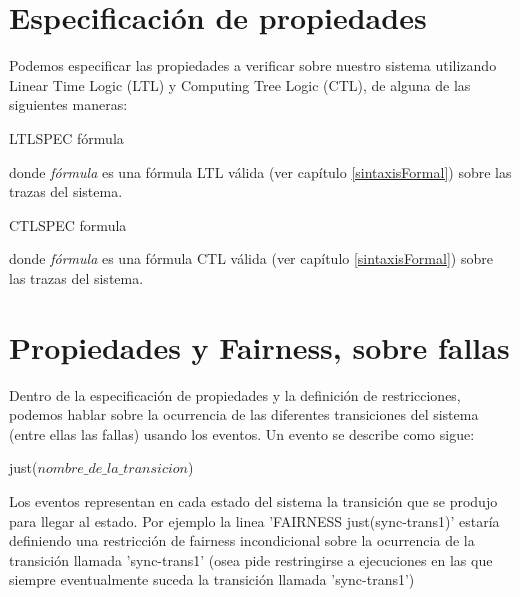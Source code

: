\documentclass[titlepage, 12pt]{book}
\begin{document}


\section{Especificaci\'on de propiedades}
Podemos especificar las propiedades a verificar sobre nuestro sistema utilizando Linear Time Logic (LTL) y Computing Tree Logic (CTL), de alguna de las siguientes maneras:

\begin{center}LTLSPEC f\'ormula\end{center}
donde \textit{f\'ormula} es una f\'ormula LTL v\'alida (ver cap\'itulo \ref{sintaxisFormal}) sobre las trazas del sistema.

\begin{center}CTLSPEC formula\end{center}
donde \textit{f\'ormula} es una f\'ormula CTL v\'alida (ver cap\'itulo \ref{sintaxisFormal}) sobre las trazas del sistema.




\section{Propiedades y Fairness, sobre fallas}
Dentro de la especificaci\'on de propiedades y la definici\'on de restricciones, podemos hablar sobre la ocurrencia de las diferentes transiciones del sistema (entre ellas las fallas) usando los eventos. Un evento se describe como sigue:
\begin{center}just($nombre\_de\_la\_transicion$)\end{center}
Los eventos representan en cada estado del sistema la transici\'on que se produjo para llegar al estado. Por ejemplo la linea 'FAIRNESS just(sync-trans1)' estar\'ia definiendo una restricci\'on de fairness incondicional sobre la ocurrencia de la transici\'on llamada 'sync-trans1' (osea pide restringirse a ejecuciones en las que siempre eventualmente suceda la transici\'on llamada 'sync-trans1')
\end{document}
